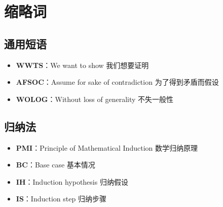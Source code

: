 \section{缩略词}

\subsection{通用短语}

\begin{itemize}
    \item \textbf{WWTS}：We want to show 我们想要证明
    \item \textbf{AFSOC}：Assume for sake of contradiction 为了得到矛盾而假设
    \item \textbf{WOLOG}：Without loss of generality 不失一般性
\end{itemize}

\subsection{归纳法}

\begin{itemize}
    \item \textbf{PMI}：Principle of Mathematical Induction 数学归纳原理
    \item \textbf{BC}：Base case 基本情况
    \item \textbf{IH}：Induction hypothesis 归纳假设
    \item \textbf{IS}：Induction step 归纳步骤
\end{itemize}